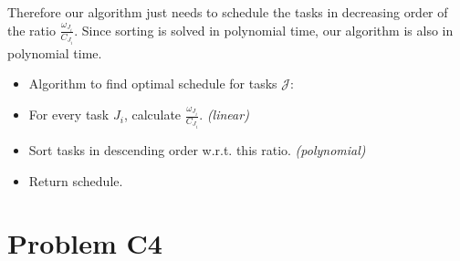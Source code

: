 \documentclass[12pt]{article}
\begin{document}
Therefore our algorithm just needs to schedule the tasks in decreasing order of the ratio $\frac{\omega_{J_i}}{C_{J_i}}$. Since sorting is solved in polynomial time, our algorithm is also in polynomial time. 

\begin{itemize}
\item Algorithm to find optimal schedule for tasks $\mathcal{J}$:
\item For every task $J_i$, calculate $\frac{\omega_{J_i}}{C_{J_i}}$. \textit{(linear)}
\item Sort tasks in descending order w.r.t. this ratio. \textit{(polynomial)}
\item Return schedule.
\end{itemize}


\section*{Problem C4}
\end{document}
